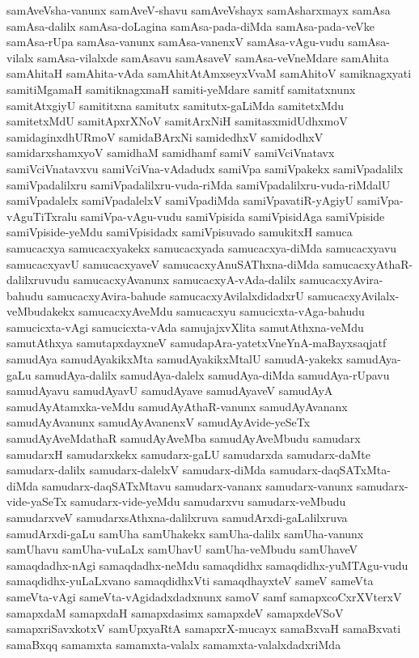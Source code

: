 {samAveVsha-vanunx
samAveV-shavu
samAveVshayx
samAsharxmayx
samAsa
samAsa-dalilx
samAsa-doLagina
samAsa-pada-diMda
samAsa-pada-veVke
samAsa-rUpa
samAsa-vanunx
samAsa-vanenxV
samAsa-vAgu-vudu
samAsa-vilalx
samAsa-vilalxde
samAsavu
samAsaveV
samAsa-veVneMdare
samAhita
samAhitaH
samAhita-vAda
samAhitAtAmxseyxVvaM
samAhitoV
samiknagxyati
samitiMgamaH
samitiknagxmaH
samiti-yeMdare
samitf
samitatxnunx
samitAtxgiyU
samititxna
samitutx
samitutx-gaLiMda
samitetxMdu
samitetxMdU
samitApxrXNoV
samitArxNiH
samitasxmidUdhxmoV
samidaginxdhURmoV
samidaBArxNi
samidedhxV
samidodhxV
samidarxshamxyoV
samidhaM
samidhamf
samiV
samiVciVnatavx
samiVciVnatavxvu
samiVciVna-vAdadudx
samiVpa
samiVpakekx
samiVpadalilx
samiVpadalilxru
samiVpadalilxru-vuda-riMda
samiVpadalilxru-vuda-riMdalU
samiVpadalelx
samiVpadalelxV
samiVpadiMda
samiVpavatiR-yAgiyU
samiVpa-vAguTiTxralu
samiVpa-vAgu-vudu
samiVpisida
samiVpisidAga
samiVpiside
samiVpiside-yeMdu
samiVpisidadx
samiVpisuvado
samukitxH
samuca
samucacxya
samucacxyakekx
samucacxyada
samucacxya-diMda
samucacxyavu
samucacxyavU
samucacxyaveV
samucacxyAnuSAThxna-diMda
samucacxyAthaR-dalilxruvudu
samucacxyAvanunx
samucacxyA-vAda-dalilx
samucacxyAvira-bahudu
samucacxyAvira-bahude
samucacxyAvilalxdidadxrU
samucacxyAvilalx-veMbudakekx
samucacxyAveMdu
samucacxyu
samucicxta-vAga-bahudu
samucicxta-vAgi
samucicxta-vAda
samujajxvXlita
samutAthxna-veMdu
samutAthxya
samutapxdayxneV
samudapAra-yatetxVneYnA-maBayxsaqjatf
samudAya
samudAyakikxMta
samudAyakikxMtalU
samudA-yakekx
samudAya-gaLu
samudAya-dalilx
samudAya-dalelx
samudAya-diMda
samudAya-rUpavu
samudAyavu
samudAyavU
samudAyave
samudAyaveV
samudAyA
samudAyAtamxka-veMdu
samudAyAthaR-vanunx
samudAyAvananx
samudAyAvanunx
samudAyAvanenxV
samudAyAvide-yeSeTx
samudAyAveMdathaR
samudAyAveMba
samudAyAveMbudu
samudarx
samudarxH
samudarxkekx
samudarx-gaLU
samudarxda
samudarx-daMte
samudarx-dalilx
samudarx-dalelxV
samudarx-diMda
samudarx-daqSATxMta-diMda
samudarx-daqSATxMtavu
samudarx-vananx
samudarx-vanunx
samudarx-vide-yaSeTx
samudarx-vide-yeMdu
samudarxvu
samudarx-veMbudu
samudarxveV
samudarxsAthxna-dalilxruva
samudArxdi-gaLalilxruva
samudArxdi-gaLu
samUha
samUhakekx
samUha-dalilx
samUha-vanunx
samUhavu
samUha-vuLaLx
samUhavU
samUha-veMbudu
samUhaveV
samaqdadhx-nAgi
samaqdadhx-neMdu
samaqdidhx
samaqdidhx-yuMTAgu-vudu
samaqdidhx-yuLaLxvano
samaqdidhxVti
samaqdhayxteV
sameV
sameVta
sameVta-vAgi
sameVta-vAgidadxdadxnunx
samoV
samf
samapxcoCxrXVterxV
samapxdaM
samapxdaH
samapxdasimx
samapxdeV
samapxdeVSoV
samapxriSavxkotxV
samUpxyaRtA
samapxrX-mucayx
samaBxvaH
samaBxvati
samaBxqq
samamxta
samamxta-valalx
samamxta-valalxdadxriMda
}
